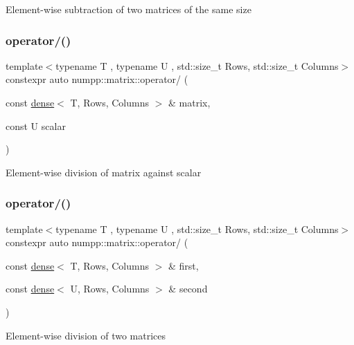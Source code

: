 Element-\/wise subtraction of two matrices of the same size\mbox{\label{group__numpp__structures__matrices__dense_ga47bac473f5d6fe8ca8e085f8897d3f81}} 
\subsubsection{\texorpdfstring{operator/()}{operator/()}\hspace{0.1cm}{\footnotesize\ttfamily [1/2]}}
{\footnotesize\ttfamily template$<$typename T , typename U , std\+::size\+\_\+t Rows, std\+::size\+\_\+t Columns$>$ \\
constexpr auto numpp\+::matrix\+::operator/ (\begin{DoxyParamCaption}\item[{const \hyperlink{classnumpp_1_1matrix_1_1dense}{dense}$<$ T, Rows, Columns $>$ \&}]{matrix,  }\item[{const U}]{scalar }\end{DoxyParamCaption})}

Element-\/wise division of matrix against scalar\mbox{\label{group__numpp__structures__matrices__dense_ga1a70f81ac03f3832f97467af1dd782fc}} 
\subsubsection{\texorpdfstring{operator/()}{operator/()}\hspace{0.1cm}{\footnotesize\ttfamily [2/2]}}
{\footnotesize\ttfamily template$<$typename T , typename U , std\+::size\+\_\+t Rows, std\+::size\+\_\+t Columns$>$ \\
constexpr auto numpp\+::matrix\+::operator/ (\begin{DoxyParamCaption}\item[{const \hyperlink{classnumpp_1_1matrix_1_1dense}{dense}$<$ T, Rows, Columns $>$ \&}]{first,  }\item[{const \hyperlink{classnumpp_1_1matrix_1_1dense}{dense}$<$ U, Rows, Columns $>$ \&}]{second }\end{DoxyParamCaption})}

Element-\/wise division of two matrices\mbox{\label{group__numpp__structures__matrices__dense_ga60cc656d6425b919b2876e520854d029}} 

